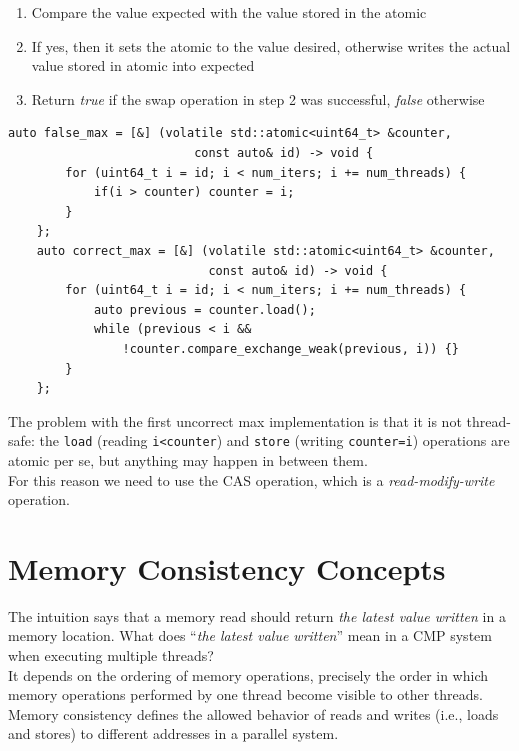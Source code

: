 \begin{enumerate}
	\item Compare the value expected with the value stored in the atomic
	\item If yes, then it sets the atomic to the value desired, otherwise writes the actual value stored in atomic into expected
	\item Return \textit{true} if the swap operation in step 2 was successful, \textit{false} otherwise
\end{enumerate}

\begin{paracol}{2}
\begin{lstlisting}[caption={Finding the max in an array}]
   auto false_max = [&] (volatile std::atomic<uint64_t> &counter,
                          const auto& id) -> void {
        for (uint64_t i = id; i < num_iters; i += num_threads) {
            if(i > counter) counter = i;
		}
    };
    auto correct_max = [&] (volatile std::atomic<uint64_t> &counter,
                            const auto& id) -> void {
        for (uint64_t i = id; i < num_iters; i += num_threads) {
            auto previous = counter.load();
            while (previous < i &&
                !counter.compare_exchange_weak(previous, i)) {}
        }
    };
\end{lstlisting}

\switchcolumn

The problem with the first uncorrect max implementation is that it is not thread-safe: the \lstinline|load| (reading \lstinline|i<counter|) and \lstinline|store| (writing \lstinline|counter=i|) operations are atomic per se, but anything may happen in between them.\\
For this reason we need to use the CAS operation, which is a \textit{read-modify-write} operation.
\end{paracol}

\section{Memory Consistency Concepts}
The intuition says that a memory read should return \textit{the latest value written} in a memory location.
What does ``\textit{the latest value written}'' mean in a CMP system when executing multiple threads?\\
It depends on the ordering of memory operations, precisely the order in which memory operations
performed by one thread become visible to other threads.
Memory consistency defines the allowed behavior of reads and writes (i.e., loads and stores) to
different addresses in a parallel system.

